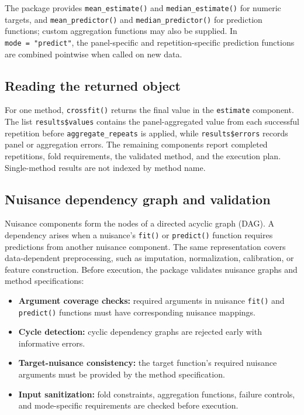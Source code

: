 The package provides \texttt{mean\_estimate()} and \texttt{median\_estimate()} for numeric targets, and \texttt{mean\_predictor()} and \texttt{median\_predictor()} for prediction functions; custom aggregation functions may also be supplied. In \texttt{mode\ =\ "predict"}, the panel-specific and repetition-specific prediction functions are combined pointwise when called on new data.

\subsection{Reading the returned object}\label{subsec:first-result}

For one method, \texttt{crossfit()} returns the final value in the \texttt{estimate} component. The list \texttt{results\$values} contains the panel-aggregated value from each successful repetition before \texttt{aggregate\_repeats} is applied, while \texttt{results\$errors} records panel or aggregation errors. The remaining components report completed repetitions, fold requirements, the validated method, and the execution plan. Single-method results are not indexed by method name.

\subsection{Nuisance dependency graph and validation}\label{subsec:dag-validation}

Nuisance components form the nodes of a directed acyclic graph (DAG). A dependency arises when a nuisance's \texttt{fit()} or \texttt{predict()} function requires predictions from another nuisance component. The same representation covers data-dependent preprocessing, such as imputation, normalization, calibration, or feature construction. Before execution, the package validates nuisance graphs and method specifications:

\begin{itemize}
\tightlist
\item
  \textbf{Argument coverage checks:} required arguments in nuisance \texttt{fit()} and \texttt{predict()} functions must have corresponding nuisance mappings.
\item
  \textbf{Cycle detection:} cyclic dependency graphs are rejected early with informative errors.
\item
  \textbf{Target-nuisance consistency:} the target function's required nuisance arguments must be provided by the method specification.
\item
  \textbf{Input sanitization:} fold constraints, aggregation functions, failure controls, and mode-specific requirements are checked before execution.
\end{itemize}

